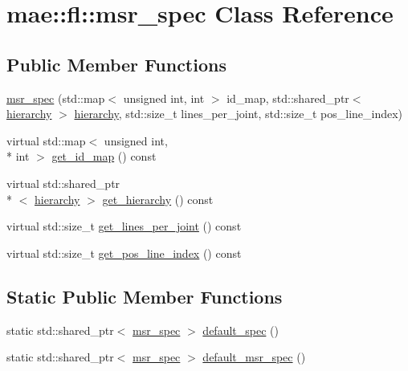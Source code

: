 \hypertarget{classmae_1_1fl_1_1msr__spec}{\section{mae\-:\-:fl\-:\-:msr\-\_\-spec Class Reference}
\label{classmae_1_1fl_1_1msr__spec}
}
\subsection*{Public Member Functions}
\begin{DoxyCompactItemize}
\item 
\hyperlink{classmae_1_1fl_1_1msr__spec_a8fbf5d2035af729ad80d7a1afe0d0746}{msr\-\_\-spec} (std\-::map$<$ unsigned int, int $>$ id\-\_\-map, std\-::shared\-\_\-ptr$<$ \hyperlink{classmae_1_1hierarchy}{hierarchy} $>$ \hyperlink{classmae_1_1hierarchy}{hierarchy}, std\-::size\-\_\-t lines\-\_\-per\-\_\-joint, std\-::size\-\_\-t pos\-\_\-line\-\_\-index)
\item 
virtual std\-::map$<$ unsigned int, \\*
int $>$ \hyperlink{classmae_1_1fl_1_1msr__spec_a6c64c60da311f2b0ec00fe1523ffcb47}{get\-\_\-id\-\_\-map} () const 
\item 
virtual std\-::shared\-\_\-ptr\\*
$<$ \hyperlink{classmae_1_1hierarchy}{hierarchy} $>$ \hyperlink{classmae_1_1fl_1_1msr__spec_a1edb3380424e28d2716cc23c422f4de9}{get\-\_\-hierarchy} () const 
\item 
virtual std\-::size\-\_\-t \hyperlink{classmae_1_1fl_1_1msr__spec_a393009aa9a87fcea0d4b42768794174a}{get\-\_\-lines\-\_\-per\-\_\-joint} () const 
\item 
virtual std\-::size\-\_\-t \hyperlink{classmae_1_1fl_1_1msr__spec_a43d90029257606e6bab771220c85ac0c}{get\-\_\-pos\-\_\-line\-\_\-index} () const 
\end{DoxyCompactItemize}
\subsection*{Static Public Member Functions}
\begin{DoxyCompactItemize}
\item 
static std\-::shared\-\_\-ptr$<$ \hyperlink{classmae_1_1fl_1_1msr__spec}{msr\-\_\-spec} $>$ \hyperlink{classmae_1_1fl_1_1msr__spec_aa8551cb455f55bf7cb922a05f724527c}{default\-\_\-spec} ()
\item 
static std\-::shared\-\_\-ptr$<$ \hyperlink{classmae_1_1fl_1_1msr__spec}{msr\-\_\-spec} $>$ \hyperlink{classmae_1_1fl_1_1msr__spec_ab469f280f82b48da0c0f1aabebc22380}{default\-\_\-msr\-\_\-spec} ()
\end{DoxyCompactItemize}


